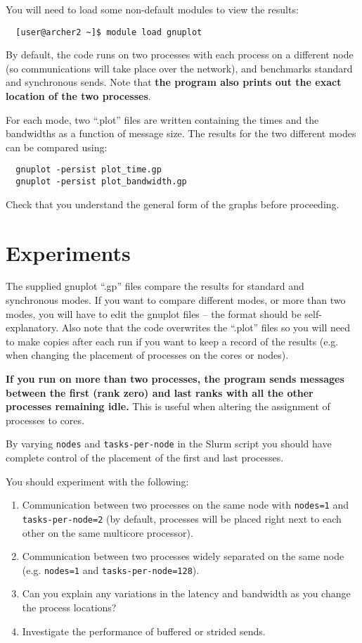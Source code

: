 \documentclass{article}
\begin{document}
You will need to load some non-default modules to view the results:
\begin{verbatim}
  [user@archer2 ~]$ module load gnuplot
\end{verbatim}

By default, the code runs on two processes with each process on a
different node (so communications will take place over the network),
and benchmarks standard and synchronous sends. Note that {\bf the
  program also prints out the exact location of the two processes}.

For each mode, two ``.plot'' files are written containing the times and
the bandwidths as a function of message size. The results for the two
different modes can be compared using:

\begin{verbatim}
  gnuplot -persist plot_time.gp
  gnuplot -persist plot_bandwidth.gp
\end{verbatim}

Check that you understand the general form of the graphs before
proceeding.

\section{Experiments}

The supplied gnuplot ``.gp'' files compare the results for standard and
synchronous modes. If you want to compare different modes, or more than
two modes, you will have to edit the gnuplot files -- the format should
be self-explanatory. Also note that the code overwrites the ``.plot''
files so you will need to make copies after each run if you want to keep
a record of the results (e.g. when changing the placement of processes
on the cores or nodes).

{\bf If you run on more than two processes, the program sends messages
  between the first (rank zero) and last ranks with all the other
  processes remaining idle.} This is useful when altering the
assignment of processes to cores.

By varying \verb+nodes+ and \verb+tasks-per-node+ in the Slurm script
you should have complete control of the placement of the first and
last processes.

You should experiment with the following:

\begin{enumerate}

\item Communication between two processes on the same node with
  \verb+nodes=1+ and \verb+tasks-per-node=2+ (by default,
  processes will be placed right next to each other on the same
  multicore processor).

\item Communication between two processes widely separated on the same
  node (e.g.   \verb+nodes=1+ and \verb+tasks-per-node=128+).

\item Can you explain any variations in the latency and bandwidth
  as you change the process locations?

\item Investigate the performance of buffered or strided sends.

\end{enumerate}
\end{document}
